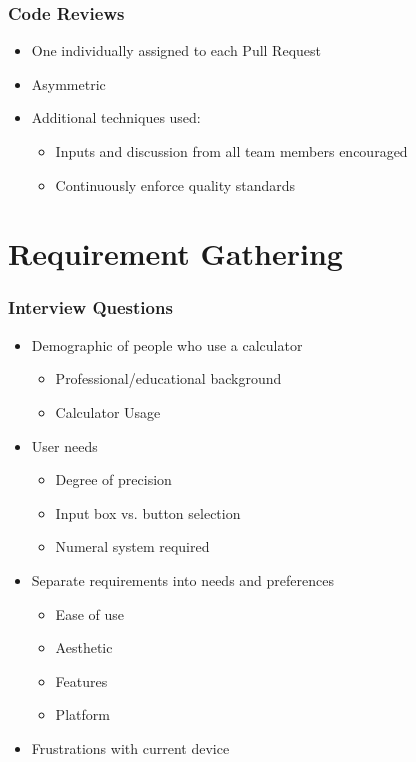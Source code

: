 \documentclass{beamer}
\begin{document}
\begin{frame}
\frametitle{Code Reviews}
 \begin{itemize}
  \item One individually assigned to each Pull Request
  \item Asymmetric
  \item Additional techniques used:
   \begin{itemize}
    \item Inputs and discussion from all team members encouraged
    \item Continuously enforce quality standards
   \end{itemize}
\end{itemize}
\end{frame}



\section{Requirement Gathering}

\begin{frame}
\frametitle{Interview Questions}
\begin{itemize}
 \item Demographic of people who use a calculator
  \begin{itemize}
   \item Professional/educational background
   \item Calculator Usage
  \end{itemize}
 \item User needs
  \begin{itemize}
   \item Degree of precision
   \item Input box vs. button selection
   \item Numeral system required
  \end{itemize}
 \item Separate requirements into needs and preferences
  \begin{itemize}
   \item Ease of use
   \item Aesthetic
   \item Features
   \item Platform
  \end{itemize}
   \item Frustrations with current device
\end{itemize}
\end{frame}
\end{document}
